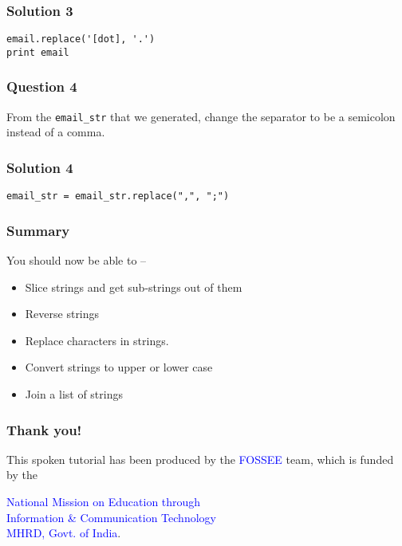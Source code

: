 \documentclass[presentation]{beamer}
\begin{document}
\begin{frame}[fragile]
\frametitle{Solution 3}
\label{sec-7}

\begin{verbatim}
email.replace('[dot], '.')
print email
\end{verbatim}
\end{frame}
\begin{frame}
\frametitle{Question 4}
\label{sec-8}

  From the \texttt{email\_str} that we generated, change the separator to be a
  semicolon instead of a comma.
\end{frame}
\begin{frame}[fragile]
\frametitle{Solution 4}
\label{sec-9}

\begin{verbatim}
email_str = email_str.replace(",", ";")
\end{verbatim}
\end{frame}
\begin{frame}
\frametitle{Summary}
\label{sec-10}

  You should now be able to --
\begin{itemize}
\item Slice strings and get sub-strings out of them
\item Reverse strings
\item Replace characters in strings.
\item Convert strings to upper or lower case
\item Join a list of strings
\end{itemize}
\end{frame}
\begin{frame}
\frametitle{Thank you!}
\label{sec-11}

  \begin{block}{}
  \begin{center}
  This spoken tutorial has been produced by the
  \textcolor{blue}{FOSSEE} team, which is funded by the 
  \end{center}
  \begin{center}
    \textcolor{blue}{National Mission on Education through \\
      Information \& Communication Technology \\ 
      MHRD, Govt. of India}.
  \end{center}  
  \end{block}
\end{frame}
\end{document}
